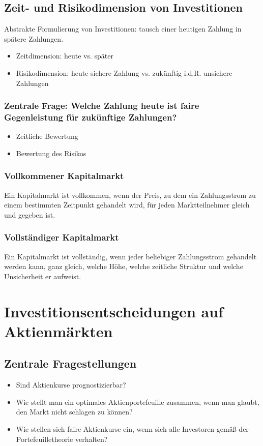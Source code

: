 \subsection{Zeit- und Risikodimension von Investitionen}
Abstrakte Formulierung von Investitionen: tausch einer heutigen Zahlung in spätere Zahlungen.
\begin{itemize}
	\item Zeitdimension: heute vs. später
	\item Risikodimension: heute sichere Zahlung vs. zukünftig i.d.R. unsichere Zahlungen
\end{itemize}

\subsubsection{Zentrale Frage: Welche Zahlung heute ist faire Gegenleistung für zukünftige Zahlungen?}
\begin{itemize}
	\item Zeitliche Bewertung
	\item Bewertung des Risikos
\end{itemize}

\subsubsection{Vollkommener Kapitalmarkt}
Ein Kapitalmarkt ist vollkommen, wenn der Preis, zu dem ein Zahlungsstrom zu einem bestimmten Zeitpunkt gehandelt wird, für jeden Marktteilnehmer gleich und gegeben ist.

\subsubsection{Vollständiger Kapitalmarkt}
Ein Kapitalmarkt ist vollständig, wenn jeder beliebiger Zahlungsstrom gehandelt werden kann, ganz gleich, welche Höhe, welche zeitliche Struktur und welche Unsicherheit er aufweist.



\section{Investitionsentscheidungen auf Aktienmärkten}

\subsection{Zentrale Fragestellungen}
\begin{itemize}
	\item Sind Aktienkurse prognostizierbar?
	\item Wie stellt man ein optimales Aktienportefeuille zusammen, wenn man glaubt, den Markt nicht schlagen zu können?
	\item Wie stellen sich faire Aktienkurse ein, wenn sich alle Investoren gemäß der Portefeuilletheorie verhalten?
\end{itemize}


